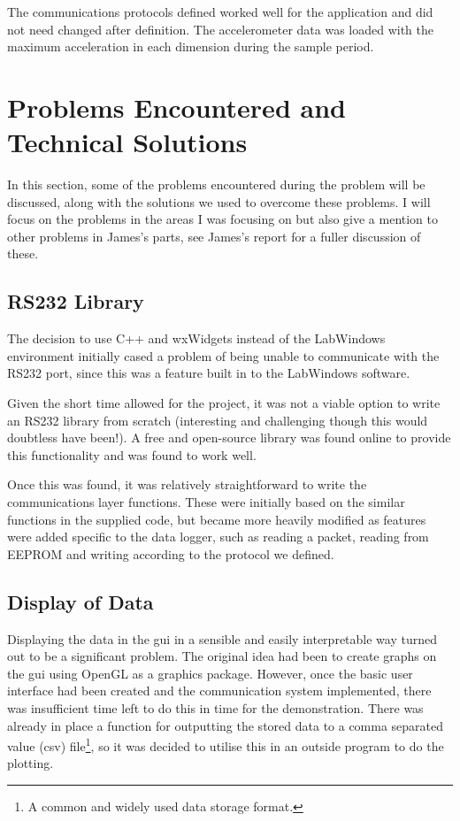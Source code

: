 \documentclass[a4paper,10pt]{article}  %
\begin{document}
The communications protocols defined worked well for the application
and did not need changed after definition. The accelerometer data was
loaded with the maximum acceleration in each dimension during the
sample period.

\section{Problems Encountered and Technical Solutions}
\label{sec:probl-enco-techn}

In this section, some of the problems encountered during the problem
will be discussed, along with the solutions we used to overcome these
problems. I will focus on the problems in the areas I was focusing on
but also give a mention to other problems in James's parts, see
James's report for a fuller discussion of these.

\subsection{RS232 Library}

The decision to use C++ and wxWidgets instead of the LabWindows
environment initially cased a problem of being unable to communicate
with the RS232 port, since this was a feature built in to the
LabWindows software.

Given the short time allowed for the project, it was not a viable
option to write an RS232 library from scratch (interesting and
challenging though this would doubtless have been!). A free and
open-source library was found online\cite{rs232_lib} to provide this
functionality and was found to work well.

Once this was found, it was relatively straightforward to write the
communications layer functions. These were initially based on the
similar functions in the supplied code, but became more heavily
modified as features were added specific to the data logger, such as
reading a packet, reading from EEPROM and writing according to the
protocol we defined.

\subsection{Display of Data}

Displaying the data in the gui in a sensible and easily interpretable
way turned out to be a significant problem. The original idea had been
to create graphs on the gui using OpenGL as a graphics
package. However, once the basic user interface had been created and
the communication system implemented, there was insufficient time left
to do this in time for the demonstration. There was already in place a
function for outputting the stored data to a comma separated value
(csv) file\footnote{A common and widely used data storage format.}, so
it was decided to utilise this in an outside program to do the
plotting.
\end{document}
